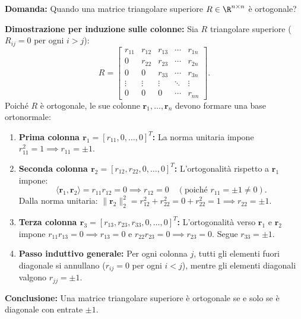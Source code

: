 \begin{example}
\textbf{Domanda:} Quando una matrice triangolare superiore $R \in \R^{n \times n}$ \`e ortogonale?

\textbf{Dimostrazione per induzione sulle colonne:} Sia $R$ triangolare superiore ($R_{ij} = 0$ per ogni $i > j$):
\begin{equation}
    R = \begin{bmatrix}
        r_{11} & r_{12} & r_{13} & \cdots & r_{1n} \\
        0 & r_{22} & r_{23} & \cdots & r_{2n} \\
        0 & 0 & r_{33} & \cdots & r_{3n} \\
        \vdots & \vdots & \vdots & \ddots & \vdots \\
        0 & 0 & 0 & \cdots & r_{nn}
    \end{bmatrix}.
\end{equation}
Poich\'e $R$ \`e ortogonale, le sue colonne $\mathbf{r}_1, \dots, \mathbf{r}_n$ devono formare una base ortonormale:
\begin{enumerate}
    \item \textbf{Prima colonna $\mathbf{r}_1 = [r_{11}, 0, \dots, 0]^T$:}
    La norma unitaria impone $r_{11}^2 = 1 \implies r_{11} = \pm 1$.
    \item \textbf{Seconda colonna $\mathbf{r}_2 = [r_{12}, r_{22}, 0, \dots, 0]^T$:}
    L'ortogonalit\`a rispetto a $\mathbf{r}_1$ impone:
    \begin{equation}
        \langle \mathbf{r}_1, \mathbf{r}_2 \rangle = r_{11} r_{12} = 0 \implies r_{12} = 0 \quad (\text{poich\'e } r_{11} = \pm 1 \neq 0).
    \end{equation}
    Dalla norma unitaria: $\|\mathbf{r}_2\|_2^2 = r_{12}^2 + r_{22}^2 = 0 + r_{22}^2 = 1 \implies r_{22} = \pm 1$.
    \item \textbf{Terza colonna $\mathbf{r}_3 = [r_{13}, r_{23}, r_{33}, 0, \dots, 0]^T$:}
    L'ortogonalit\`a verso $\mathbf{r}_1$ e $\mathbf{r}_2$ impone $r_{11} r_{13} = 0 \implies r_{13} = 0$ e $r_{22} r_{23} = 0 \implies r_{23} = 0$. Segue $r_{33} = \pm 1$.
    \item \textbf{Passo induttivo generale:} Per ogni colonna $j$, tutti gli elementi fuori diagonale si annullano ($r_{ij} = 0$ per ogni $i < j$), mentre gli elementi diagonali valgono $r_{jj} = \pm 1$.
\end{enumerate}
\textbf{Conclusione:} Una matrice triangolare superiore \`e ortogonale se e solo se \`e diagonale con entrate $\pm 1$.
\end{example}

